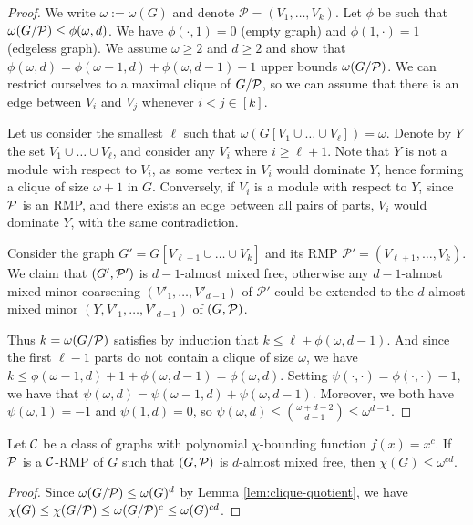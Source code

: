 \begin{proof}
We write $\omega:=\omega(G)$ and denote $\mathcal{P} = (V_1, \ldots, V_k)$. Let $\phi$ be such that $\omega(G/{\cal P}) \leq \phi(\omega, d)$. We have $\phi(\cdot, 1)=0$ (empty graph) and $\phi(1, \cdot) = 1$ (edgeless graph). We assume $\omega\geq 2$ and $d\geq 2$ and show that $\phi(\omega, d)= \phi(\omega-1, d)+\phi(\omega, d-1)+1$ upper bounds $\omega(G/{\cal P})$. We can restrict ourselves to a maximal clique of $G/{\cal P}$, so we can assume that there is an edge between $V_i$ and $V_j$ whenever $i < j \in [k]$.    

Let us consider the smallest $\ell$ such that $\omega(G[V_1\cup \dots \cup V_{\ell}])=\omega$. Denote by $Y$ the set $V_1\cup \dots \cup V_{\ell}$, and consider any $V_i$ where $i\geq \ell +1$. Note that $Y$ is not a module with respect to $V_i$, as some vertex in $V_i$ would dominate $Y$, hence forming a clique of size $\omega +1$ in $G$. Conversely, if $V_i$ is a module with respect to $Y$, since $\cal P$ is an RMP, and there exists an edge between all pairs of parts, $V_i$ would dominate $Y$, with the same contradiction.

Consider the graph $G'=G[V_{\ell+1}\cup \dots \cup V_{k}]$ and its RMP $\mathcal{P'} = (V_{\ell +1}, \ldots, V_k)$. We claim that $(G',\cal P')$ is $d-1$-almost mixed free, otherwise any $d-1$-almost mixed minor coarsening $(V'_1, \ldots, V'_{d-1})$ of $\mathcal{P'}$ could be extended to the $d$-almost mixed minor $(Y,V'_1, \ldots, V'_{d-1})$ of $(G,\cal P)$. 

Thus $k=\omega (G/\cal P)$ satisfies by induction that $k\leq \ell + \phi(\omega, d-1)$. And since the first $\ell -1$ parts do not contain a clique of size $\omega$, we have $k \leq \phi(\omega - 1, d) + 1 + \phi(\omega, d-1)= \phi(\omega, d)$. Setting  $\psi(\cdot,\cdot)=\phi(\cdot,\cdot)-1$, we have that $\psi (\omega,d)=\psi(\omega - 1, d) + \psi(\omega, d-1)$. Moreover, we both have $\psi (\omega,1)=-1$ and $\psi (1,d)=0$, so $\psi (\omega,d)\leq \binom{\omega + d - 2}{d-1}\leq \omega ^{d-1}$.
\end{proof}


\begin{proposition} \label{prop:RMPpcb} Let $\cal C$ be a class of graphs with polynomial $\chi$-bounding function $f(x)=x^c$. If $\cal P$ is a $\cal C$-RMP of $G$ such that $(G,\cal P)$ is $d$-almost mixed free, then $\chi (G)\leq \omega ^{cd}$.
\end{proposition}

\begin{proof}
   Since $\omega(G/{\cal P}) \leq \omega(G)^{d}$ by Lemma \ref{lem:clique-quotient}, we have $\chi(G)\leq \chi(G/{\cal P})\leq \omega(G/{\cal P})^c\leq \omega(G)^{cd}$.
\end{proof} 
